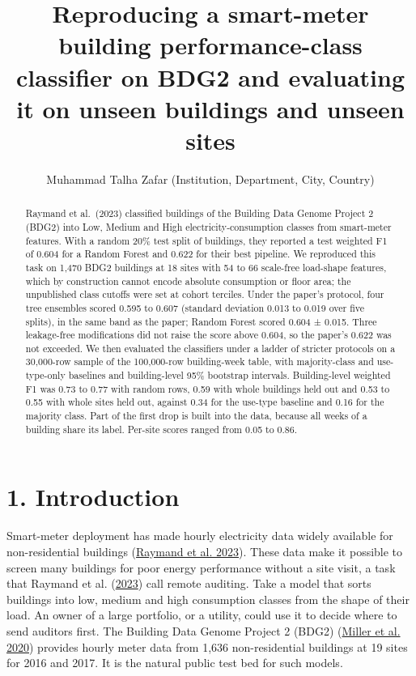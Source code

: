 \documentclass[
  10pt,
]{article}
\title{Reproducing a smart-meter building performance-class classifier
on BDG2 and evaluating it on unseen buildings and unseen sites}
\author{Muhammad Talha Zafar (Institution, Department, City, Country)}
\date{}
\begin{document}
\maketitle
\begin{abstract}
Raymand et al.~(2023) classified buildings of the Building Data Genome
Project 2 (BDG2) into Low, Medium and High electricity-consumption
classes from smart-meter features. With a random 20\% test split of
buildings, they reported a test weighted F1 of 0.604 for a Random Forest
and 0.622 for their best pipeline. We reproduced this task on 1,470 BDG2
buildings at 18 sites with 54 to 66 scale-free load-shape features,
which by construction cannot encode absolute consumption or floor area;
the unpublished class cutoffs were set at cohort terciles. Under the
paper's protocol, four tree ensembles scored 0.595 to 0.607 (standard
deviation 0.013 to 0.019 over five splits), in the same band as the
paper; Random Forest scored 0.604 ± 0.015. Three leakage-free
modifications did not raise the score above 0.604, so the paper's 0.622
was not exceeded. We then evaluated the classifiers under a ladder of
stricter protocols on a 30,000-row sample of the 100,000-row
building-week table, with majority-class and use-type-only baselines and
building-level 95\% bootstrap intervals. Building-level weighted F1 was
0.73 to 0.77 with random rows, 0.59 with whole buildings held out and
0.53 to 0.55 with whole sites held out, against 0.34 for the use-type
baseline and 0.16 for the majority class. Part of the first drop is
built into the data, because all weeks of a building share its label.
Per-site scores ranged from 0.05 to 0.86.
\end{abstract}

\hypertarget{introduction}{%
\section{1. Introduction}\label{introduction}}

Smart-meter deployment has made hourly electricity data widely available
for non-residential buildings
(\protect\hyperlink{ref-raymand2023}{Raymand et al. 2023}). These data
make it possible to screen many buildings for poor energy performance
without a site visit, a task that Raymand et al.
(\protect\hyperlink{ref-raymand2023}{2023}) call remote auditing. Take a
model that sorts buildings into low, medium and high consumption classes
from the shape of their load. An owner of a large portfolio, or a
utility, could use it to decide where to send auditors first. The
Building Data Genome Project 2 (BDG2)
(\protect\hyperlink{ref-miller2020}{Miller et al. 2020}) provides hourly
meter data from 1,636 non-residential buildings at 19 sites for 2016 and
2017. It is the natural public test bed for such models.
\end{document}
